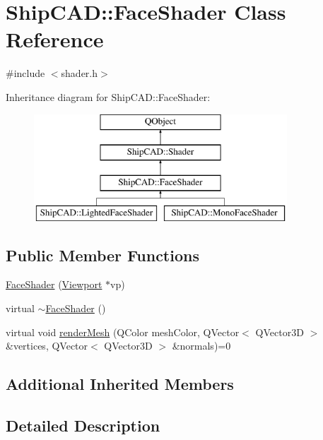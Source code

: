 \hypertarget{classShipCAD_1_1FaceShader}{\section{Ship\-C\-A\-D\-:\-:Face\-Shader Class Reference}
\label{classShipCAD_1_1FaceShader}
}


{\ttfamily \#include $<$shader.\-h$>$}

Inheritance diagram for Ship\-C\-A\-D\-:\-:Face\-Shader\-:\begin{figure}[H]
\begin{center}
\leavevmode
\includegraphics[height=4.000000cm]{classShipCAD_1_1FaceShader}
\end{center}
\end{figure}
\subsection*{Public Member Functions}
\begin{DoxyCompactItemize}
\item 
\hyperlink{classShipCAD_1_1FaceShader_a67bd0296f829456035a829b95f1befb7}{Face\-Shader} (\hyperlink{classShipCAD_1_1Viewport}{Viewport} $\ast$vp)
\item 
virtual \hyperlink{classShipCAD_1_1FaceShader_afbd21e69afb094aea484144be9ac1fbd}{$\sim$\-Face\-Shader} ()
\item 
virtual void \hyperlink{classShipCAD_1_1FaceShader_adb71f051d1481058fe905f985a7166c1}{render\-Mesh} (Q\-Color mesh\-Color, Q\-Vector$<$ Q\-Vector3\-D $>$ \&vertices, Q\-Vector$<$ Q\-Vector3\-D $>$ \&normals)=0
\end{DoxyCompactItemize}
\subsection*{Additional Inherited Members}


\subsection{Detailed Description}


